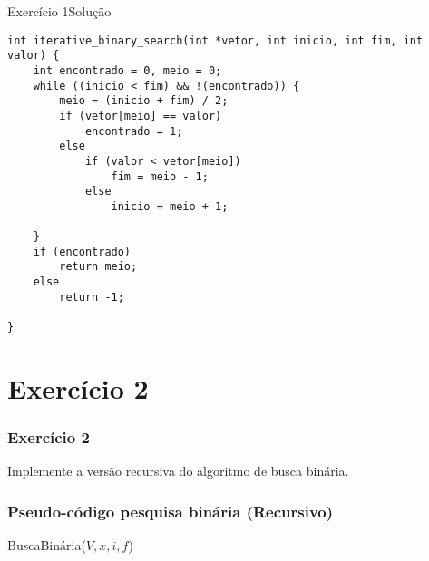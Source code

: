 \documentclass[aspectratio=169]{beamer}
\begin{document}

\begin{frame}[fragile]{Exercício 1}{Solução}
\begin{lstlisting}[style=CStyle]
int iterative_binary_search(int *vetor, int inicio, int fim, int valor) {
    int encontrado = 0, meio = 0;
    while ((inicio < fim) && !(encontrado)) {
        meio = (inicio + fim) / 2;
        if (vetor[meio] == valor) 
            encontrado = 1;
        else 
            if (valor < vetor[meio]) 
                fim = meio - 1;
            else 
                inicio = meio + 1;

    }
    if (encontrado)
        return meio;
    else
        return -1;

}
\end{lstlisting}  
\end{frame}

\section{Exercício 2}

\begin{frame}
\frametitle{Exercício 2}
Implemente a versão recursiva do algoritmo de busca binária.
\end{frame}


\begin{frame}
\frametitle{Pseudo-código pesquisa binária (Recursivo)}
\begin{algorithm}[H]
\caption{BuscaBinária($V,x,i,f$)} 
\label{pesquisa_binaria_recursiva}
\end{algorithm}
\end{frame}



\end{document}
